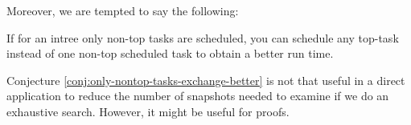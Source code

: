 Moreover, we are tempted to say the following:

\begin{conjecture}
  \label{conj:only-nontop-tasks-exchange-better}
  If for an intree only non-top tasks are scheduled, you can schedule any top-task instead of one non-top scheduled task to obtain a better run time.
\end{conjecture}

Conjecture \ref{conj:only-nontop-tasks-exchange-better} is not that useful in a direct application to reduce the number of snapshots needed to examine if we do an exhaustive search. However, it might be useful for proofs.


